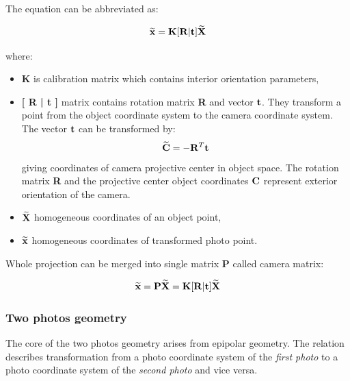 \documentclass[a4paper,12pt]{article}
\newcommand{\ematr}[1]{%
{\bf #1}%
}
\newcommand{\evect}[1]{%
{\bf #1}%
}
\newcommand{\ehvect}[1]{%
{\bf \widetilde{#1}}%
}
\newcommand{\term}[1]{%
{\it #1}%
}
\begin{document}
The equation can be abbreviated as:

\begin{equation}
\label{eq:p_exp}
\ehvect{x} = \ematr{K} \ematr{[}\ematr{R}|\evect{t}\ematr{]} \ehvect{X}
\end{equation}

\noindent where:

\begin{itemize}
\item \ematr{K} is calibration matrix which contains interior orientation parameters,
\item \ematr{[\ematr{R}|\evect{t}]} matrix contains rotation matrix \ematr{R} and vector $\evect{t}$.
	      They transform a point from the object coordinate system 
	      to the camera coordinate system. 
	      The vector $\evect{t}$ can  be transformed by:
	      \begin{equation}
	      \ehvect{C} = - \ematr{R}^{T}\evect{t}
	      \end{equation}
	      giving coordinates of camera projective center in object space. 
	      The rotation matrix \ematr{R} and the projective 
	      center object coordinates $\evect{C}$
	      represent exterior orientation of the camera.   
\item $\ehvect{X}$  homogeneous coordinates of an object point,
\item $\ehvect{x}$  homogeneous coordinates of transformed photo point.
\end{itemize}

Whole projection can be merged into single matrix \ematr{P} called camera matrix:

\begin{equation}
\label{eq:p_abbr}
\ehvect{x} =  \ematr{P} \ehvect{X} = \ematr{K} \ematr{[}\ematr{R}|\evect{t}\ematr{]} \ehvect{X}
\end{equation}

\subsubsection{Two photos geometry}
\label{sec:epipolar_gem}




The core of the two photos geometry arises from epipolar geometry.
The relation describes transformation from a photo coordinate system of the \term{first photo} to 
a photo coordinate system of the \term{second photo} and vice versa.
\end{document}
